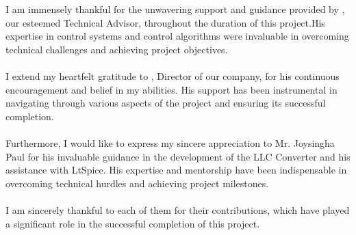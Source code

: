 I am immensely thankful for the unwavering support and guidance provided by
\industry, our esteemed Technical Advisor, throughout the duration of this
project.His expertise in control systems and control algorithms were invaluable
in overcoming technical challenges and achieving project objectives.\\
\\
I extend my heartfelt gratitude to \director, Director of our company, for his
continuous encouragement and belief in my abilities. His support has been
instrumental in navigating through various aspects of the project and ensuring
its successful completion.\\
\\
Furthermore, I would like to express my sincere appreciation to Mr. Joysingha Paul
for his invaluable guidance in the development of the LLC Converter and his assistance
with LtSpice. His expertise and mentorship have been indispensable in overcoming
technical hurdles and achieving project milestones.\\
\\
I am sincerely thankful to each of them for their contributions, which have
played a significant role in the successful completion of this project.
\\
\vfill
\vspace*{5cm}
\begin{minipage}[t]{1\textwidth}
    \raggedleft
    \name \\
    \sid
\end{minipage}